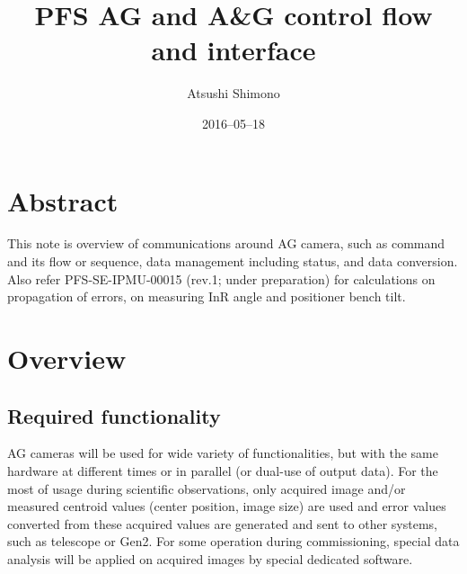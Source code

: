 \documentclass[a4paper,notitlepage]{article}
\title{PFS AG and A\&G control flow and interface}
\author{Atsushi Shimono}
\date{2016--05--18}
\begin{document}
{}

\ssnhead

\section{Abstract}

This note is overview of communications around AG camera, such as command and 
its flow or sequence, data management including status, and data conversion. 
Also refer PFS-SE-IPMU-00015 
(rev.1; under preparation) for calculations on propagation of errors, 
on measuring InR angle and positioner bench tilt.

\section{Overview}

\subsection{Required functionality}

AG cameras will be used for wide variety of functionalities, but with the same 
hardware at different times or in parallel (or dual-use of output data). For 
the most of usage during scientific observations, only acquired image and/or 
measured centroid values (center position, image size) are used and error 
values converted from these acquired values are generated and sent to other 
systems, such as telescope or Gen2. For some operation during commissioning, 
special data analysis will be applied on acquired images by special dedicated 
software.
\end{document}
